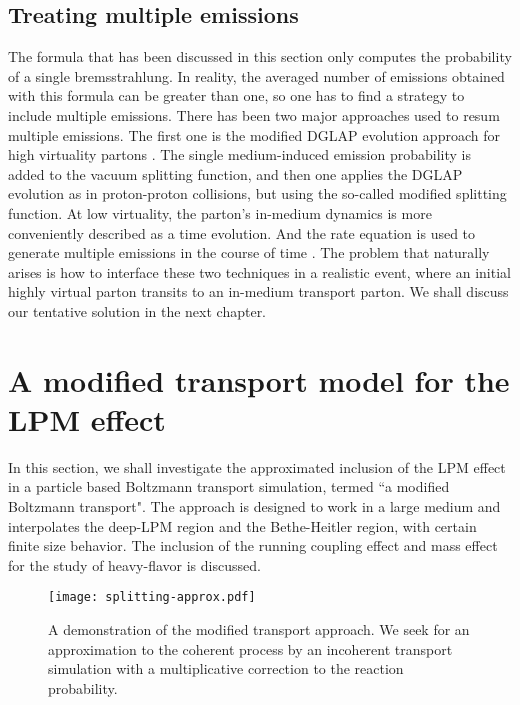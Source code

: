 \subsection{Treating multiple emissions}
The formula that has been discussed in this section only computes the probability of a single bremsstrahlung.
In reality, the averaged number of emissions obtained with this formula can be greater than one, so one has to find a strategy to include multiple emissions.
There has been two major approaches used to resum multiple emissions.
The first one is the modified DGLAP evolution approach for high virtuality partons \cite{Wang:2002pk,Cao:2017qpx}.
The single medium-induced emission probability is added to the vacuum splitting function, and then one applies the DGLAP evolution as in proton-proton collisions, but using the so-called modified splitting function.
At low virtuality, the parton's in-medium dynamics is more conveniently described as a time evolution. 
And the rate equation is used to generate multiple emissions in the course of time \cite{Arnold:2002zm,Jeon:2003gi,Schenke:2009gb}.
The problem that naturally arises is how to interface these two techniques in a realistic event, where an initial highly virtual parton transits to an in-medium transport parton.
We shall discuss our tentative solution in the next chapter.


\section{A modified transport model for the LPM effect}
\label{section:modified-transport}
In this section, we shall investigate the approximated inclusion of the LPM effect in a particle based Boltzmann transport simulation, termed ``a modified Boltzmann transport".
The approach is designed to work in a large medium and interpolates the deep-LPM region and the Bethe-Heitler region, with certain finite size behavior.
The inclusion of the running coupling effect and mass effect for the study of heavy-flavor is discussed.

\begin{figure}
\centering
\texttt{[image: splitting-approx.pdf]}
\caption{A demonstration of the modified transport approach. We seek for an approximation to the coherent process by an incoherent transport simulation with a multiplicative correction to the reaction probability.}
\label{fig:split-approx}
\end{figure}
